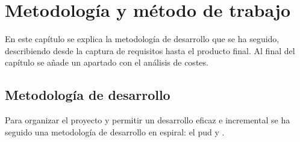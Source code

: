 \chapter{Metodología y método de trabajo}
\label{cap:metodologia}

En este capítulo se explica la metodología de desarrollo que se ha seguido, describiendo desde la captura de requisitos hasta el producto final. Al final del capítulo se añade un apartado con el análisis de costes.

\section{Metodología de desarrollo}

Para organizar el proyecto y permitir un desarrollo eficaz e incremental se ha seguido una metodología de desarrollo en espiral: el \gls{pud}\cite{pud} y \cite{apuntes}.


